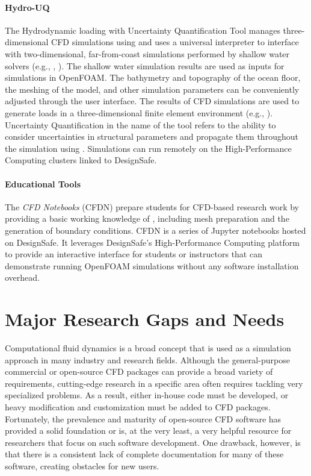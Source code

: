 \paragraph{Hydro-UQ} The Hydrodynamic loading with Uncertainty Quantification Tool  manages three-dimensional CFD simulations using  and uses a universal interpreter to interface with two-dimensional, far-from-coast simulations performed by shallow water solvers (e.g., , ). The shallow water simulation results are used as inputs for simulations in OpenFOAM. The bathymetry and topography of the ocean floor, the meshing of the model, and other simulation parameters can be conveniently adjusted through the user interface.  The results of CFD simulations are used to generate loads in a three-dimensional finite element environment (e.g., ). Uncertainty Quantification in the name of the tool refers to the ability to consider uncertainties in structural parameters and propagate them throughout the simulation using . Simulations can run remotely on the High-Performance Computing clusters linked to DesignSafe.

\paragraph{Educational Tools} The \emph{CFD Notebooks} (CFDN) prepare students for CFD-based research work by providing a basic working knowledge of , including mesh preparation and the generation of boundary conditions. CFDN is a series of Jupyter notebooks hosted on DesignSafe. It leverages DesignSafe's High-Performance Computing platform to provide an interactive interface for students or instructors that can demonstrate running OpenFOAM simulations without any software installation overhead.


\section{Major Research Gaps and Needs}
\label{sec:resp_cfd_water_gaps}

Computational fluid dynamics is a broad concept that is used as a simulation approach in many industry and research fields. Although the general-purpose commercial or open-source CFD packages can provide a broad variety of requirements, cutting-edge research in a specific area often requires tackling very specialized problems. As a result, either in-house code must be developed, or heavy modification and customization must be added to CFD packages. Fortunately, the prevalence and maturity of open-source CFD software has provided a solid foundation or is, at the very least, a very helpful resource for researchers that focus on such software development.  One drawback, however, is that there is a consistent lack of complete documentation for many of these software, creating obstacles for new users.

